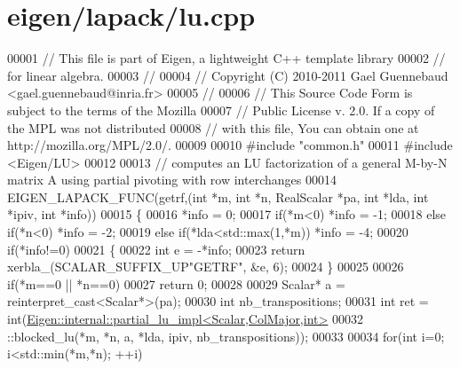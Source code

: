\hypertarget{eigen_2lapack_2lu_8cpp_source}{}\section{eigen/lapack/lu.cpp}
\label{eigen_2lapack_2lu_8cpp_source}

\begin{DoxyCode}
00001 \textcolor{comment}{// This file is part of Eigen, a lightweight C++ template library}
00002 \textcolor{comment}{// for linear algebra.}
00003 \textcolor{comment}{//}
00004 \textcolor{comment}{// Copyright (C) 2010-2011 Gael Guennebaud <gael.guennebaud@inria.fr>}
00005 \textcolor{comment}{//}
00006 \textcolor{comment}{// This Source Code Form is subject to the terms of the Mozilla}
00007 \textcolor{comment}{// Public License v. 2.0. If a copy of the MPL was not distributed}
00008 \textcolor{comment}{// with this file, You can obtain one at http://mozilla.org/MPL/2.0/.}
00009 
00010 \textcolor{preprocessor}{#include "common.h"}
00011 \textcolor{preprocessor}{#include <Eigen/LU>}
00012 
00013 \textcolor{comment}{// computes an LU factorization of a general M-by-N matrix A using partial pivoting with row interchanges}
00014 EIGEN\_LAPACK\_FUNC(getrf,(\textcolor{keywordtype}{int} *m, \textcolor{keywordtype}{int} *n, RealScalar *pa, \textcolor{keywordtype}{int} *lda, \textcolor{keywordtype}{int} *ipiv, \textcolor{keywordtype}{int} *info))
00015 \{
00016   *info = 0;
00017         \textcolor{keywordflow}{if}(*m<0)                  *info = -1;
00018   \textcolor{keywordflow}{else}  \textcolor{keywordflow}{if}(*n<0)                  *info = -2;
00019   \textcolor{keywordflow}{else}  \textcolor{keywordflow}{if}(*lda<std::max(1,*m))   *info = -4;
00020   \textcolor{keywordflow}{if}(*info!=0)
00021   \{
00022     \textcolor{keywordtype}{int} e = -*info;
00023     \textcolor{keywordflow}{return} xerbla\_(SCALAR\_SUFFIX\_UP\textcolor{stringliteral}{"GETRF"}, &e, 6);
00024   \}
00025 
00026   \textcolor{keywordflow}{if}(*m==0 || *n==0)
00027     \textcolor{keywordflow}{return} 0;
00028 
00029   Scalar* a = \textcolor{keyword}{reinterpret\_cast<}Scalar*\textcolor{keyword}{>}(pa);
00030   \textcolor{keywordtype}{int} nb\_transpositions;
00031   \textcolor{keywordtype}{int} ret = int(\hyperlink{struct_eigen_1_1internal_1_1partial__lu__impl}{Eigen::internal::partial\_lu\_impl<Scalar,ColMajor,int>}
00032                      ::blocked\_lu(*m, *n, a, *lda, ipiv, nb\_transpositions));
00033 
00034   \textcolor{keywordflow}{for}(\textcolor{keywordtype}{int} i=0; i<std::min(*m,*n); ++i)

\end{DoxyCode}
